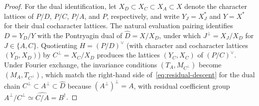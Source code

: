 \documentclass[11pt,a4paper,reqno]{amsart}
\theoremstyle{plain}
\theoremstyle{definition}
\theoremstyle{remark}
\numberwithin{equation}{section}
\begin{document}
\begin{proof}
For the dual identification, let $X_D\subset X_C\subset X_A\subset X$ denote the character lattices of $P/D$, $P/C$, $P/A$, and $P$, respectively, and write $Y_J=X_J^*$ and $Y=X^*$ for their dual cocharacter lattices. The natural evaluation pairing identifies $D=Y_D/Y$ with the Pontryagin dual of $\widehat D=X/X_D$, under which $J^\perp=X_J/X_D$ for $J\in\{A,C\}$. Quotienting $H=(P/D)^\vee$ (with character and cocharacter lattices $(Y_D,X_D)$) by $C^\perp=X_C/X_D$ produces the lattices $(Y_C,X_C)$ of $(P/C)^\vee$. Under Fourier exchange, the invariance conditions $(T_A,M_{C^\perp})$ become $(M_A,T_{C^\perp})$, which match the right-hand side of~\eqref{eq:residual-descent} for the dual chain $C^\perp\subset A^\perp\subset\widehat D$ because $(A^\perp)^\perp=A$, with residual coefficient group $A^\perp/C^\perp\simeq\widehat{C/A}=B^\dagger$.
\end{proof}
\end{document}

